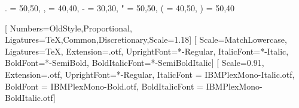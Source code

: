 \usepackage[
  paperwidth=\gbanchopagina,
  paperheight=\gbaltopagina,
  inner=\gbmargeninterior,
  outer=\gbmargenexterior,
  top=\gbmargensuperior,
  bottom=\gbmargeninferior,
  includehead,
  includefoot,
  headsep=14pt,
  footskip=0pt,
  top=35pt,
  footnotesep=14pt plus 0.1pt minus 0.1pt
]{geometry}

%
\ifgbcruces
  \usepackage[width=\gbanchomontaje,height=\gbaltomontaje,cam,center]{crop}
\fi

\addto\captionsspanish{\renewcommand{\contentsname}{Sumario}}

\usepackage{fontspec}
\usepackage[final,babel=true]{microtype}
{ . = {50,50}, , = {40,40}, - = {30,30}, " = {50,50}, ( = {40,50}, ) = {50,40} }

\def\gbfuentetexto{Libertinus Serif}
\def\gbfuentetitulos{IBM Plex Sans Condensed}
\def\gbfuentemono{IBM Plex Mono}

\setmainfont{\gbfuentetexto}[
  Numbers={OldStyle,Proportional},
  Ligatures={TeX,Common,Discretionary},Scale=1.18]
\setsansfont{\gbfuentetitulos}[
Scale=MatchLowercase,
Ligatures=TeX,
Extension=.otf,
UprightFont=*-Regular,
ItalicFont=*-Italic,
BoldFont=*-SemiBold,
BoldItalicFont=*-SemiBoldItalic]
\setmonofont{\gbfuentemono}[
Scale=0.91,
Extension=.otf,
UprightFont=*-Regular,
ItalicFont = IBMPlexMono-Italic.otf,
BoldFont = IBMPlexMono-Bold.otf,
BoldItalicFont = IBMPlexMono-BoldItalic.otf]

